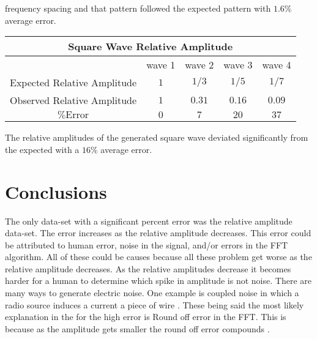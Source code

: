 \documentclass{article}
\newcommand{\pError}[0]{\ensuremath{\% \text{Error}}}
\newcommand{\tableFrac}[2]{\ensuremath{#1/#2}}
\begin{document}
frequency spacing and that pattern followed the expected pattern with $1.6\%$
average error.
\begin{center}
  \begin{tabular}{|c|c|c|c|c|}
    \multicolumn{5}{c}{Square Wave Relative Amplitude} \\
    \hline
    {} & wave 1 & wave 2 & wave 3 & wave 4 \\
    \hline
    Expected Relative Amplitude
       & $1$   & $\tableFrac{1}{3}$ & $\tableFrac{1}{5}$ & $\tableFrac{1}{7}$ \\
    Observed Relative Amplitude
       & $1$   & $0.31$ & $0.16$ & $0.09$ \\
    $\pError$
       & $0$   & $7$    & $20$   & $37$  \\
    \hline
  \end{tabular}
\end{center}
The relative amplitudes of the generated square wave deviated significantly from
the expected with a $16\%$ average error.
\section{Conclusions}
The only data-set with a significant percent error was the relative amplitude
data-set. The error increases as the relative amplitude decreases.
This error could be attributed to human error, noise in the signal,
and/or errors in the FFT algorithm. All of these could be causes because all these
problem get worse as the relative amplitude decreases. As the relative
amplitudes decrease it becomes harder for a human to determine which spike in
amplitude is not noise. There are many ways to generate electric noise. One
example is coupled noise in which a radio source induces a current a piece of
wire \cite{motchenbacher:1}. These being said the most likely explanation in
the for the high error is Round off error in the FFT. This is because as the
amplitude gets smaller the round off error compounds \cite{ramos:1}.


\end{document}
